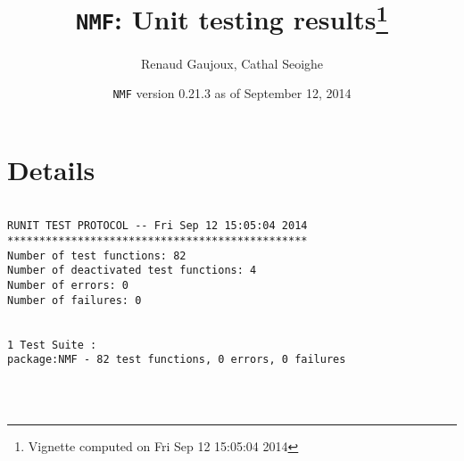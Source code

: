 \documentclass[10pt]{article}\usepackage[]{graphicx}\usepackage[]{color}
\author{Renaud Gaujoux, Cathal Seoighe}
\title{\texttt{NMF}: Unit testing results\footnote{Vignette computed  on Fri Sep 12 15:05:04 2014}}
\date{\texttt{NMF} version 0.21.3 as of September 12, 2014}
\begin{document}
\maketitle

\section{Details}
\begin{verbatim}

RUNIT TEST PROTOCOL -- Fri Sep 12 15:05:04 2014 
*********************************************** 
Number of test functions: 82 
Number of deactivated test functions: 4 
Number of errors: 0 
Number of failures: 0 

 
1 Test Suite : 
package:NMF - 82 test functions, 0 errors, 0 failures




\end{verbatim}
\end{document}

